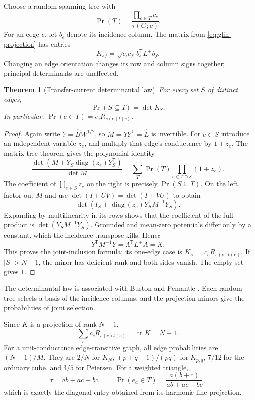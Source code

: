 \documentclass[11pt]{article}
\newtheorem{theorem}{Theorem}[section]
\theoremstyle{definition}
\theoremstyle{remark}
\begin{document}
Choose a random spanning tree with
\[
 \Pr(T)=\frac{\prod_{e\in T}c_e}{\tau(G;c)}.
\]
For an edge $e$, let $b_e$ denote its incidence column. The matrix from \eqref{eq:glin-projection} has entries
\[
 K_{ef}=\sqrt{c_ec_f}\,b_e^{\mathsf T}L^+b_f.
\]
Changing an edge orientation changes its row and column signs together; principal determinants are unaffected.

\begin{theorem}[Transfer-current determinantal law]\label{thm:glin-transfer-current}
For every set $S$ of distinct edges,
\begin{equation}\label{eq:glin-dpp}
 \Pr(S\subseteq T)=\det K_S.
\end{equation}
In particular, $\Pr(e\in T)=c_eR_{s(e)t(e)}$.
\end{theorem}
\begin{proof}
Again write $Y=\widehat B W^{1/2}$, so $M=YY^{\mathsf T}=\widehat L$ is invertible. For $e\in S$ introduce an independent variable $z_e$, and multiply that edge's conductance by $1+z_e$. The matrix-tree theorem gives the polynomial identity
\[
 \frac{\det(M+Y_S\operatorname{diag}(z_e)Y_S^{\mathsf T})}{\det M}
 =\sum_T\Pr(T)\prod_{e\in T\cap S}(1+z_e).
\]
The coefficient of $\prod_{e\in S}z_e$ on the right is precisely $\Pr(S\subseteq T)$. On the left, factor out $M$ and use $\det(I+UV)=\det(I+VU)$ to obtain
\[
 \det\!\left(I_S+\operatorname{diag}(z_e)
                  Y_S^{\mathsf T}M^{-1}Y_S\right).
\]
Expanding by multilinearity in its rows shows that the coefficient of the full product is $\det(Y_S^{\mathsf T}M^{-1}Y_S)$. Grounded and mean-zero potentials differ only by a constant, which the incidence transpose kills. Hence
\[
 Y^{\mathsf T}M^{-1}Y=A^{\mathsf T}L^+A=K.
\]
This proves the joint-inclusion formula; its one-edge case is $K_{ee}=c_eR_{s(e)t(e)}$. If $|S|>N-1$, the minor has deficient rank and both sides vanish. The empty set gives $1$.
\end{proof}

The determinantal law is associated with Burton and Pemantle \cite{glinBurtonPemantle1993}. Each random tree selects a basis of the incidence columns, and the projection minors give the probabilities of joint selection.

Since $K$ is a projection of rank $N-1$,
\begin{equation}\label{eq:glin-foster}
 \sum_e c_eR_{s(e)t(e)}=\operatorname{tr}K=N-1.
\end{equation}
For a unit-conductance edge-transitive graph, all edge probabilities are $(N-1)/M$. They are $2/N$ for $K_N$, $(p+q-1)/(pq)$ for $K_{p,q}$, $7/12$ for the ordinary cube, and $3/5$ for Petersen. For a weighted triangle,
\[
 \tau=ab+ac+bc,\qquad
 \Pr(e_a\in T)=\frac{a(b+c)}{ab+ac+bc},
\]
which is exactly the diagonal entry obtained from its harmonic-line projection.
\end{document}
